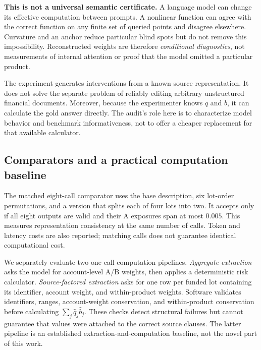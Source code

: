 \textbf{This is not a universal semantic certificate.} A language model can change its effective computation between prompts. A nonlinear function can agree with the correct function on any finite set of queried points and disagree elsewhere. Curvature and an anchor reduce particular blind spots but do not remove this impossibility. Reconstructed weights are therefore \emph{conditional diagnostics}, not measurements of internal attention or proof that the model omitted a particular product.

The experiment generates interventions from a known source representation. It does not solve the separate problem of reliably editing arbitrary unstructured financial documents. Moreover, because the experimenter knows $q$ and $b$, it can calculate the gold answer directly. The audit's role here is to characterize model behavior and benchmark informativeness, not to offer a cheaper replacement for that available calculator.



\subsection{Comparators and a practical computation baseline}
The matched eight-call comparator uses the base description, six lot-order permutations, and a version that splits each of four lots into two. It accepts only if all eight outputs are valid and their A exposures span at most $0.005$. This measures representation consistency at the same number of calls. Token and latency costs are also reported; matching calls does not guarantee identical computational cost.

We separately evaluate two one-call computation pipelines. \emph{Aggregate extraction} asks the model for account-level A/B weights, then applies a deterministic risk calculator. \emph{Source-factored extraction} asks for one row per funded lot containing its identifier, account weight, and within-product weights. Software validates identifiers, ranges, account-weight conservation, and within-product conservation before calculating $\sum_j\widehat q_j\widehat b_j$. These checks detect structural failures but cannot guarantee that values were attached to the correct source clauses. The latter pipeline is an established extraction-and-computation baseline, not the novel part of this work.

